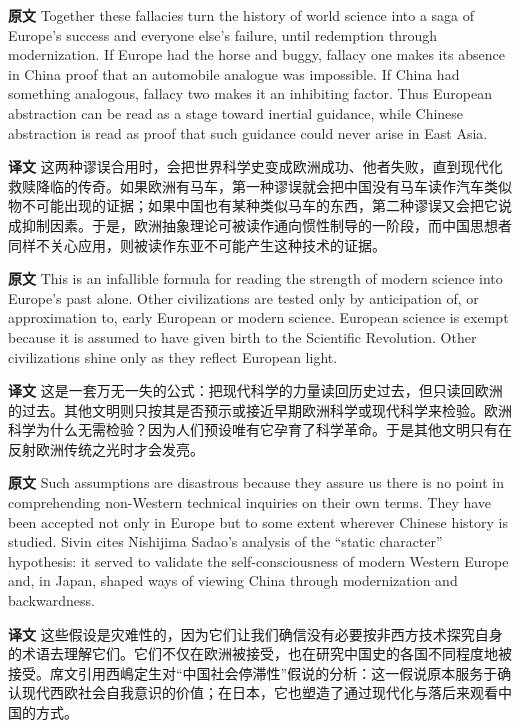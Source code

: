 \documentclass[UTF8,zihao=-4]{ctexart}
\newcommand{\BodyFont}{\fontsize{10.5pt}{15.5pt}\selectfont}
\newcommand{\origlabel}{\textbf{原文}\quad}
\newcommand{\translabel}{\textbf{译文}\quad}
\newenvironment{enblock}{\par\noindent\begingroup\BodyFont\origlabel}{\par\endgroup}
\newenvironment{zhblock}{\par\noindent\begingroup\BodyFont\translabel}{\par\endgroup\vspace{0.35em}}
\begin{document}
\begin{enblock}
Together these fallacies turn the history of world science into a saga of Europe's success and everyone else's failure, until redemption through modernization. If Europe had the horse and buggy, fallacy one makes its absence in China proof that an automobile analogue was impossible. If China had something analogous, fallacy two makes it an inhibiting factor. Thus European abstraction can be read as a stage toward inertial guidance, while Chinese abstraction is read as proof that such guidance could never arise in East Asia.
\end{enblock}
\begin{zhblock}
这两种谬误合用时，会把世界科学史变成欧洲成功、他者失败，直到现代化救赎降临的传奇。如果欧洲有马车，第一种谬误就会把中国没有马车读作汽车类似物不可能出现的证据；如果中国也有某种类似马车的东西，第二种谬误又会把它说成抑制因素。于是，欧洲抽象理论可被读作通向惯性制导的一阶段，而中国思想者同样不关心应用，则被读作东亚不可能产生这种技术的证据。
\end{zhblock}

\begin{enblock}
This is an infallible formula for reading the strength of modern science into Europe's past alone. Other civilizations are tested only by anticipation of, or approximation to, early European or modern science. European science is exempt because it is assumed to have given birth to the Scientific Revolution. Other civilizations shine only as they reflect European light.
\end{enblock}
\begin{zhblock}
这是一套万无一失的公式：把现代科学的力量读回历史过去，但只读回欧洲的过去。其他文明则只按其是否预示或接近早期欧洲科学或现代科学来检验。欧洲科学为什么无需检验？因为人们预设唯有它孕育了科学革命。于是其他文明只有在反射欧洲传统之光时才会发亮。
\end{zhblock}

\begin{enblock}
Such assumptions are disastrous because they assure us there is no point in comprehending non-Western technical inquiries on their own terms. They have been accepted not only in Europe but to some extent wherever Chinese history is studied. Sivin cites Nishijima Sadao's analysis of the ``static character'' hypothesis: it served to validate the self-consciousness of modern Western Europe and, in Japan, shaped ways of viewing China through modernization and backwardness.
\end{enblock}
\begin{zhblock}
这些假设是灾难性的，因为它们让我们确信没有必要按非西方技术探究自身的术语去理解它们。它们不仅在欧洲被接受，也在研究中国史的各国不同程度地被接受。席文引用西嶋定生对“中国社会停滞性”假说的分析：这一假说原本服务于确认现代西欧社会自我意识的价值；在日本，它也塑造了通过现代化与落后来观看中国的方式。
\end{zhblock}
\end{document}
